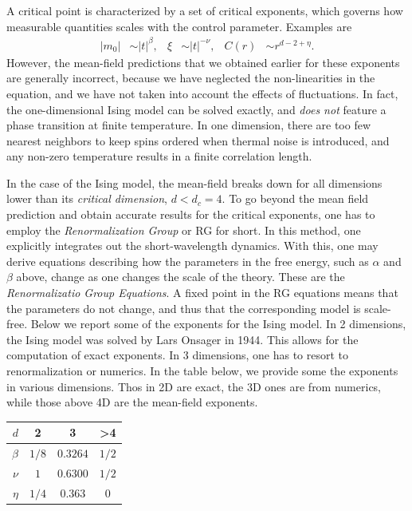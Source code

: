 A critical point is characterized by a set of critical exponents, which governs how measurable quantities scales with the control parameter.
Examples are
%
\begin{align}
    |m_0| &\sim |t|^\beta, &
    \xi & \sim |t|^{-\nu}, &
    C(r) & \sim r^{d - 2 + \eta}.
\end{align}
%
However, the mean-field predictions that we obtained earlier for these exponents are generally incorrect, because we have neglected the non-linearities in the equation, and we have not taken into account the effects of fluctuations.
In fact, the one-dimensional Ising model can be solved exactly, and \emph{does not} feature a phase transition at finite temperature.
In one dimension, there are too few nearest neighbors to keep spins ordered when thermal noise is introduced, and any non-zero temperature results in a finite correlation length.

In the case of the Ising model, the mean-field breaks down for all dimensions lower than its \emph{critical dimension}, $d < d_c = 4$.
To go beyond the mean field prediction and obtain accurate results for the critical exponents, one has to employ the \emph{Renormalization Group} or RG for short.
In this method, one explicitly integrates out the short-wavelength dynamics.
With this, one may derive equations describing how the parameters in the free energy, such as $\alpha$ and $\beta$ above, change as one changes the scale of the theory.
These are the \emph{Renormalizatio Group Equations}.
A fixed point in the RG equations means that the parameters do not change, and thus that the corresponding model is scale-free.
Below we report some of the exponents for the Ising model.
In 2 dimensions, the Ising model was solved by Lars Onsager in 1944.
This allows for the computation of exact exponents.
In 3 dimensions, one has to resort to renormalization or numerics.
In the table below, we provide some the exponents in various dimensions.
Thos in 2D are exact, the 3D ones are from numerics, while those above 4D are the mean-field exponents.

\begin{table}[h]
    \centering
    \begin{tabular}{r|c c c}
        $d$ & 2 & 3 & >4 \\
        \hline
        $\beta$ & $1/8$ & $0.3264$ & $1 / 2$ \\
        $\nu$ & $1$ & $0.6300$ & $1 / 2$ \\
        $\eta$ & $1/4$ & $0.363$ & $0$
    \end{tabular}        
\end{table}


